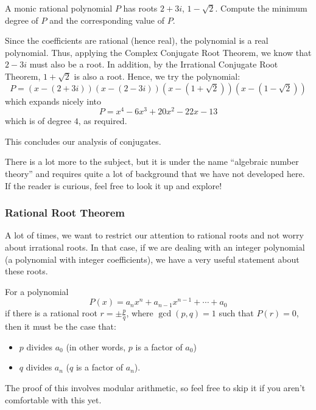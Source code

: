 \documentclass[11pt]{scrartcl}
\begin{document}
\begin{example*}
A monic rational polynomial $P$ has roots $2+3i$, $1-\sqrt{2}$. Compute the minimum degree of $P$ and the corresponding value of $P$.
\end{example*}

Since the coefficients are rational (hence real), the polynomial is a real polynomial. Thus, applying the Complex Conjugate Root Theorem, we know that $2-3i$ must also be a root. In addition, by the Irrational Conjugate Root Theorem, $1+\sqrt{2}$ is also a root. Hence, we try the polynomial: \[P = (x-(2+3i))(x-(2-3i))(x-(1+\sqrt{2}))(x-(1-\sqrt{2}))\] which expands nicely into \[P = x^4 - 6 x^3 + 20 x^2 - 22 x - 13\] which is of degree $4$, as required.

This concludes our analysis of conjugates.

\begin{remark*}
There is a lot more to the subject, but it is under the name ``algebraic number theory'' and requires quite a lot of background that we have not developed here. If the reader is curious, feel free to look it up and explore!
\end{remark*}

\subsubsection{Rational Root Theorem}

A lot of times, we want to restrict our attention to rational roots and not worry about irrational roots. In that case, if we are dealing with an integer polynomial (a polynomial with integer coefficients), we have a very useful statement about these roots.

\begin{theorem*}
For a polynomial \[P(x) = a_nx^n+a_{n-1}x^{n-1}+\cdots+a_0\] if there is a rational root $r = \pm\tfrac{p}{q}$, where $\gcd(p, q) = 1$ such that $P(r) = 0$, then it must be the case that:
\begin{itemize}
\item $p$ divides $a_0$ (in other words, $p$ is a factor of $a_0$)
\item $q$ divides $a_n$ ($q$ is a factor of $a_n$).
\end{itemize}
\end{theorem*}

The proof of this involves modular arithmetic, so feel free to skip it if you aren't comfortable with this yet.
\end{document}
